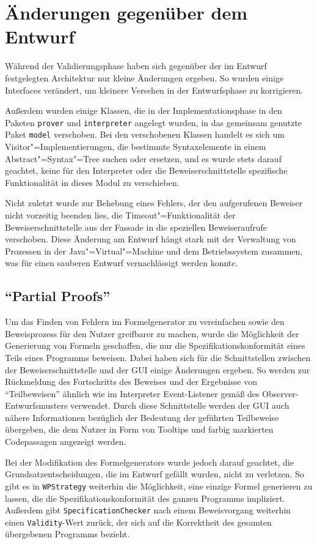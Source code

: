 \section{Änderungen gegenüber dem Entwurf}

Während der Validierungsphase haben sich gegenüber der im Entwurf festgelegten Architektur nur kleine Änderungen ergeben. So wurden einige Interfaces verändert, um kleinere Versehen in der Entwurfsphase zu korrigieren.

Außerdem wurden einige Klassen, die in der Implementationsphase in den Paketen \texttt{prover} und \texttt{interpreter} angelegt wurden, in das gemeinsam genutzte Paket \texttt{model} verschoben. Bei den verschobenen Klassen handelt es sich um Visitor"=Implementierungen, die bestimmte Syntaxelemente in einem Abstract"=Syntax"=Tree suchen oder ersetzen, und es wurde stets darauf geachtet, keine für den Interpreter oder die Beweiserschnittstelle spezifische Funktionalität in dieses Modul zu verschieben.

Nicht zuletzt wurde zur Behebung eines Fehlers, der den aufgerufenen Beweiser nicht vorzeitig beenden lies, die Timeout"=Funktionalität der Beweiserschnittstelle aus der Fassade in die speziellen Beweiseraufrufe verschoben. Diese Änderung am Entwurf hängt stark mit der Verwaltung von Prozessen in der Java"=Virtual"=Machine und dem Betriebssystem zusammen, was für einen sauberen Entwurf vernachlässigt werden konnte.

\subsection{"`Partial Proofs"'}

Um das Finden von Fehlern im Formelgenerator zu vereinfachen sowie den Beweisprozess für den Nutzer greifbarer zu machen, wurde die Möglichkeit der Generierung von Formeln geschaffen, die nur die Spezifikationskonformität eines Teils eines Programms beweisen. Dabei haben sich für die Schnittstellen zwischen der Beweiserschnittstelle und der GUI einige Änderungen ergeben. So werden zur Rückmeldung des Fortschritts des Beweises und der Ergebnisse von "`Teilbeweisen"' ähnlich wie im Interpreter Event-Listener gemäß des Observer-Entwurfsmusters verwendet. Durch diese Schnittstelle werden der GUI auch nähere Informationen bezüglich der Bedeutung der geführten Teilbeweise übergeben, die dem Nutzer in Form von Tooltips und farbig markierten Codepassagen angezeigt werden.

Bei der Modifikation des Formelgenerators wurde jedoch darauf geachtet, die Grundsatzentscheidungen, die im Entwurf gefällt wurden, nicht zu verletzen. So gibt es in \texttt{WPStrategy} weiterhin die Möglichkeit, eine einzige Formel generieren zu lassen, die die Spezifikationskonformität des ganzen Programms impliziert. Außerdem gibt \texttt{SpecificationChecker} nach einem Beweisvorgang weiterhin einen \texttt{Validity}-Wert zurück, der sich auf die Korrektheit des gesamten übergebenen Programms bezieht.

